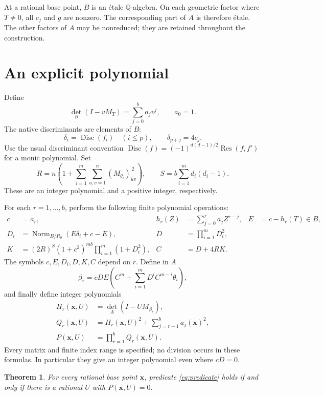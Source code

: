 \documentclass[11pt,a4paper]{article}
\newtheorem{theorem}{Theorem}[section]
\newcommand{\Q}{\mathbb Q}\newcommand{\Z}{\mathbb Z}
\DeclareMathOperator{\Res}{Res}
\DeclareMathOperator{\Norm}{Norm}
\DeclareMathOperator{\Disc}{Disc}
\begin{document}
At a rational base point, $B$ is an \'etale $\Q$-algebra.
On each geometric factor where $T\ne0$, all $c_j$ and $g$ are
nonzero. The corresponding part of $A$ is therefore \'etale.
The other factors of $A$ may be nonreduced; they are retained
throughout the construction.

\section{An explicit polynomial}

Define
\[
 \det_B(I-vM_T)=\sum_{j=0}^b a_jv^j,\qquad a_0=1.
\]
The native discriminants are elements of $B$:
\[
 \delta_i=\Disc(f_i)\quad (i\le p),\qquad
 \delta_{p+j}=4c_j.
\]
Use the usual discriminant convention
$\Disc(f)=(-1)^{d(d-1)/2}\Res(f,f')$ for a monic polynomial.
Set
\begin{equation}\label{eq:root-bound}
 R=n\left(1+\sum_{i=1}^m\sum_{u,v=1}^n
                         (M_{\theta_i})_{uv}^{\,2}\right),
 \qquad S=b\sum_{i=1}^m d_i(d_i-1).
\end{equation}
These are an integer polynomial and a positive integer,
respectively.

For each $r=1,\ldots,b$, perform the following finite polynomial
operations:
\begin{align*}
 c&=a_r,& h_r(Z)&=\sum_{j=0}^r a_jZ^{r-j},&
 E&=c-h_r(T)\in B,\\
 D_i&=\Norm_{B/R_0}(E\delta_i+c-E),&
 D&=\prod_{i=1}^mD_i^2,\\
 K&=(2R)^S(1+c^2)^{mb}\prod_{i=1}^m(1+D_i^2),&
 C&=D+4RK.
\end{align*}
The symbols $c,E,D_i,D,K,C$ depend on $r$.
Define in $A$
\begin{equation}\label{eq:beta}
 \beta_r=cDE\left(C^m+
                    \sum_{i=1}^mD^iC^{m-i}\theta_i\right),
\end{equation}
and finally define integer polynomials
\begin{align}
 H_r(\mathbf x,U)&=\det_A(I-UM_{\beta_r}),\label{eq:H}\\
 Q_r(\mathbf x,U)&=H_r(\mathbf x,U)^2+
                         \sum_{j=r+1}^b a_j(\mathbf x)^2,\label{eq:Q}\\
 P(\mathbf x,U)&=\prod_{r=1}^b Q_r(\mathbf x,U).\label{eq:P}
\end{align}
Every matrix and finite index range is specified; no division
occurs in these formulas. In particular they give an integer
polynomial even where $cD=0$.

\begin{theorem}\label{thm:main}
For every rational base point $\mathbf x$, predicate
\eqref{eq:predicate} holds if and only if there is a rational
$U$ with $P(\mathbf x,U)=0$.
\end{theorem}
\end{document}
